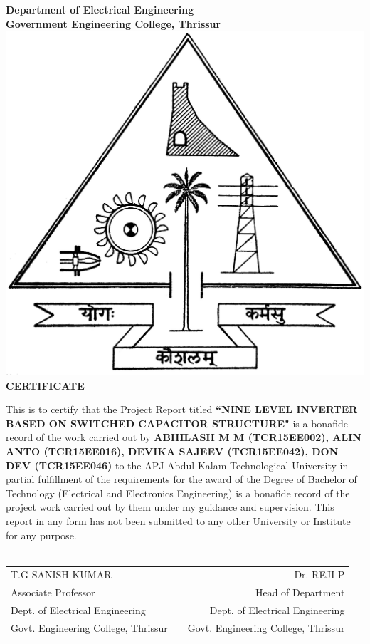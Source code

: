\documentclass[12pt,a4paper]{report}
\begin{document}
	
	\begin{center}
		{\Large \bf Department of Electrical Engineering}\\
		{\large \bf Government Engineering College, Thrissur}\\[.3 cm]
		\includegraphics[width=4 cm]{figures/gect.jpg}\\[.3cm]
		\Large  \bf CERTIFICATE\\[0.1cm]
	\end{center}		
	\quad This is to certify that the Project Report titled {\bf ``NINE LEVEL INVERTER BASED ON SWITCHED CAPACITOR STRUCTURE"} is a bonafide record of the work carried out by {\bf ABHILASH M M (TCR15EE002), ALIN ANTO (TCR15EE016), DEVIKA SAJEEV (TCR15EE042), DON DEV (TCR15EE046)} to the APJ Abdul Kalam Technological University in partial fulfillment of the requirements for the award of the Degree of Bachelor of Technology (Electrical and Electronics Engineering) is a bonafide record of the project work carried out by them under my guidance and supervision. This report in any form has not been submitted to any other University or Institute for any purpose.\\ 

	 \\
	
	\noindent\begin{tabular}{lp{0.7in}r}
		T.G SANISH KUMAR         &&  Dr. REJI P\\
		Associate Professor &&  Head of Department\\
	    Dept. of Electrical Engineering	&&  Dept. of Electrical Engineering\\
		Govt. Engineering College, Thrissur &&  Govt. Engineering College, Thrissur\\
	\end{tabular}
	\thispagestyle{empty}
	\clearpage
	
\end{document}
